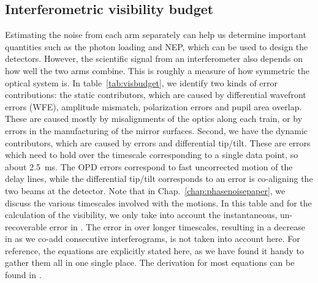 \subsection{Interferometric visibility budget}

Estimating the noise from each arm separately can help us determine important quantities such as the photon loading and NEP, which can be used to design the detectors. However, the scientific signal from an interferometer also depends on how well the two arms combine. This is roughly a measure of how symmetric the optical system is. In table~\ref{tab:visbudget}, we identify two kinds of error contributions: the static contributors, which are caused by differential wavefront errors (WFE), amplitude mismatch, polarization errors and pupil area overlap. These are caused mostly by misalignments of the optics along each train, or by errors in the manufacturing of the mirror surfaces. Second, we have the dynamic contributors, which are caused by \OPD errors and differential tip/tilt. These are errors which need to hold over the timescale corresponding to a single data point, so about \SI{2.5}{\milli\second}. The OPD errors correspond to fast uncorrected motion of the delay lines, while the differential tip/tilt corresponds to an error is co-aligning the two beams at the detector. Note that in Chap.~\ref{chap:phasenoisepaper}, we discuss the various timescales involved with the \OPD motions. In this table and for the calculation of the visibility, we only take into account the instantaneous, un-recoverable error in \OPD. The error in \OPD over longer timescales, resulting in a decrease in \SNR as we co-add consecutive interferograms, is not taken into account here. For reference, the equations are explicitly stated here, as we have found it handy to gather them all in one single place. The derivation for most equations can be found in \citet{Lawson:2000vf}.

